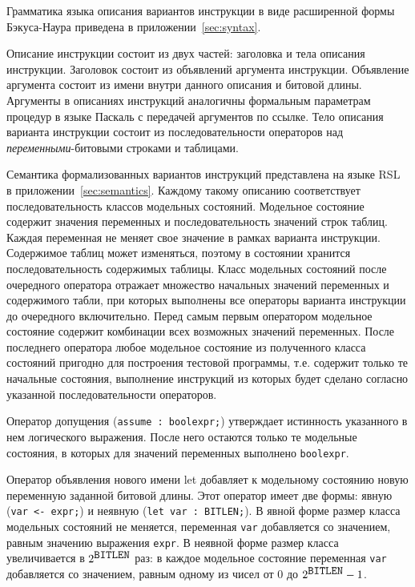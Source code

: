 Грамматика языка описания вариантов инструкции в виде расширенной формы Бэкуса-Наура приведена в приложении~\ref{sec:syntax}.

Описание инструкции состоит из двух частей: заголовка и тела описания инструкции. Заголовок состоит из объявлений аргумента инструкции. Объявление аргумента состоит из имени внутри данного описания и битовой длины. Аргументы в описаниях инструкций аналогичны формальным параметрам процедур в языке Паскаль с передачей аргументов по ссылке. Тело описания варианта инструкции состоит из последовательности операторов над \emph{переменными}-битовыми строками и таблицами.

Семантика формализованных вариантов инструкций представлена на языке RSL~\cite{RSL} в приложении~\ref{sec:semantics}. Каждому такому описанию соответствует последовательность классов модельных состояний. Модельное состояние содержит значения переменных и последовательность значений строк таблиц. Каждая переменная не меняет свое значение в рамках варианта инструкции. Содержимое таблиц может изменяться, поэтому в состоянии хранится последовательность содержимых таблицы. Класс модельных состояний после очередного оператора отражает множество начальных значений переменных и содержимого табли, при которых выполнены все операторы варианта инструкции до очередного включительно. Перед самым первым оператором модельное состояние содержит комбинации всех возможных значений переменных. После последнего оператора любое модельное состояние из полученного класса состояний пригодно для построения тестовой программы, т.е. содержит только те начальные состояния, выполнение инструкций из которых будет сделано согласно указанной последовательности операторов.

Оператор допущения (\texttt{assume : boolexpr;}) утверждает истинность указанного в нем логического выражения. После него остаются только те модельные состояния, в которых для значений переменных выполнено \texttt{boolexpr}.

Оператор объявления нового имени let добавляет к модельному состоянию новую переменную заданной битовой длины. Этот оператор имеет две формы: явную (\texttt{var <- expr;}) и неявную (\texttt{let var : BITLEN;}). В явной форме размер класса модельных состояний не меняется, переменная \texttt{var} добавляется со значением, равным значению выражения \texttt{expr}. В неявной форме размер класса увеличивается в $2^{\mbox{\texttt{BITLEN}}}$ раз: в каждое модельное состояние переменная \texttt{var} добавляется со значением, равным одному из чисел от 0 до $2^{\mbox{\texttt{BITLEN}}} - 1$.

